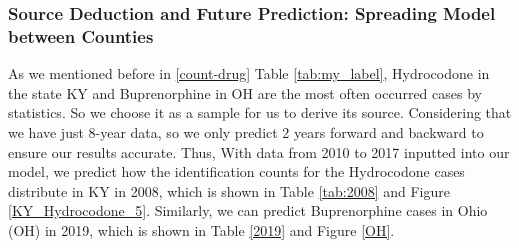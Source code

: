 \documentclass{mcmthesis}
\begin{document}
\subsubsection{Source Deduction and Future Prediction: Spreading Model between Counties}
\label{sec: Implementation}

As we mentioned before in \ref{count-drug} Table \ref{tab:my_label}, Hydrocodone in the state KY and Buprenorphine in OH are the most often occurred cases by statistics. So we choose it as a sample for us to derive its source. Considering that we have just 8-year data, so we only predict 2 years forward and backward to ensure our results accurate. Thus, With data from 2010 to 2017 inputted into our model, we predict how the identification counts for the Hydrocodone cases distribute in KY in 2008, which is shown in Table \ref{tab:2008} and Figure \ref{KY_Hydrocodone_5}. Similarly, we can predict Buprenorphine cases in Ohio (OH) in 2019, which is shown in Table \ref{2019} and Figure \ref{OH}.
\end{document}
